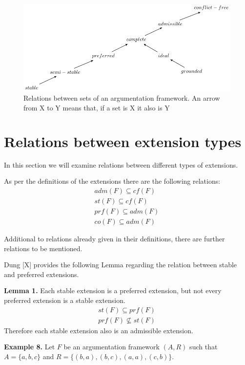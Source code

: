 \documentclass[draft,final]{vutinfth} %
\newcommand{\hl}{\par\vspace{6pt}} %
\newcommand{\cl}{\par\vspace{12pt}} %
\begin{document}
\FloatBarrier %
	\begin{figure}[!h]
		\centering
		\includegraphics[scale=1]{graphs/diagram_2.pdf}
		\caption{Relations between sets of an argumentation framework. An arrow from X to Y means that, if a set is X it also is Y}
	\end{figure}
\FloatBarrier

\section{Relations between extension types}
In this section we will examine relations between different types of extensions.\hl

As per the definitions of the extensions there are the following relations:
\begin{align} %
	adm(F)\subseteq cf(F)\\
	st(F)\subseteq cf(F)\\
	prf(F)\subseteq adm(F)\\
	co(F)\subseteq adm(F)
\end{align}\cl

Additional to relations already given in their definitions, there are further relations to be mentioned.\hl
Dung [X] provides the following Lemma regarding the relation between stable and preferred extensions.\cl %

\textbf{Lemma 1.}
Each stable extension is a preferred extension, but not every preferred extension is a stable extension.
\begin{align}
	st(F)\subseteq prf(F)\\
	prf(F)\not\subseteq st(F)
\end{align}
Therefore each stable extension also is an admissible extension.\hl

\textbf{Example 8.} Let $F$ be an argumentation framework $(A,R)$ such that $A=\{a,b,c\}$ and $R=\{(b,a),(b,c),(a,a),(c,b)\}$.\hl
\end{document}
